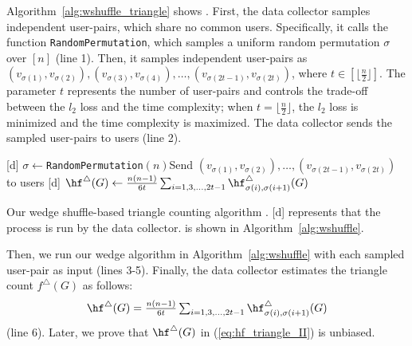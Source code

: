 Algorithm~\ref{alg:wshuffle_triangle} shows \AlgWSTri{}. 
First, the data collector samples independent user-pairs, which share no common users. 
Specifically, it calls the function \texttt{RandomPermutation}, which samples a uniform random permutation $\sigma$ over $[n]$ (line 1). 
Then, it samples independent user-pairs as 
$(v_{\sigma(1)}, v_{\sigma(2)}), (v_{\sigma(3)}, v_{\sigma(4)}), \ldots, (v_{\sigma(2t-1)}, v_{\sigma(2t)})$, where $t \in [\lfloor \frac{n}{2} \rfloor]$. 
The parameter $t$ represents the number of user-pairs and controls the trade-off between the $l_2$ loss and the time complexity; 
when $t = \lfloor \frac{n}{2} \rfloor$, the $l_2$ loss is minimized and the time complexity is maximized. 
The data collector sends the sampled user-pairs to users (line 2).

\setlength{\algomargin}{5mm}
\begin{algorithm}[t]
  \SetAlgoLined
  [d] $\sigma \leftarrow$\texttt{RandomPermutation}$(n)$\;
  [d] Send $(v_{\sigma(1)}, v_{\sigma(2)}), \ldots, (v_{\sigma(2t-1)}, v_{\sigma(2t)})$ to users\;
  [d] $\hf^\triangle(G) \leftarrow \frac{n(n-1)}{6t} \sum_{i=1, 3, \ldots, 2t-1} \hf_{\sigma(i),\sigma(i+1)}^\triangle(G)$\;
  \caption{Our wedge shuffle-based triangle counting algorithm \AlgWSTri{}.
  [d] represents that the process is run by the data collector. 
  \AlgWS{} is shown in Algorithm~\ref{alg:wshuffle}. 
  }\label{alg:wshuffle_triangle}
\end{algorithm}

Then, we run our wedge algorithm \AlgWS{} in Algorithm~\ref{alg:wshuffle} with each sampled user-pair as input (lines 3-5). 
Finally, the data collector estimates the triangle count $f^\triangle(G)$ as follows: 
\begin{align}
    \hf^\triangle(G) = \textstyle{\frac{n(n-1)}{6t} \sum_{i=1, 3, \ldots, 2t-1} \hf_{\sigma(i),\sigma(i+1)}^\triangle(G)} 
   \label{eq:hf_triangle_II}
\end{align}
(line 6). Later, we prove that $\hf^\triangle(G)$ in (\ref{eq:hf_triangle_II}) is unbiased. 

